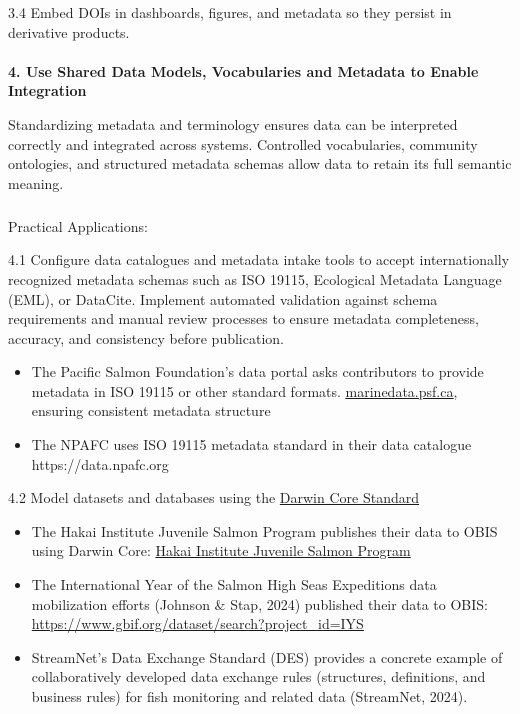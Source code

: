 \documentclass[
  letterpaper,
  DIV=11,
  numbers=noendperiod]{scrartcl}
\makeatletter
\let\oldparagraph\paragraph
\renewcommand{\paragraph}{
    \@ifstar
      \xxxParagraphStar
      \xxxParagraphNoStar
  }
\newcommand{\xxxParagraphStar}[1]{\oldparagraph*{#1}\mbox{}}
\newcommand{\xxxParagraphNoStar}[1]{\oldparagraph{#1}\mbox{}}
\let\oldsubparagraph\subparagraph
\renewcommand{\subparagraph}{
    \@ifstar
      \xxxSubParagraphStar
      \xxxSubParagraphNoStar
  }
\newcommand{\xxxSubParagraphStar}[1]{\oldsubparagraph*{#1}\mbox{}}
\newcommand{\xxxSubParagraphNoStar}[1]{\oldsubparagraph{#1}\mbox{}}
\providecommand{\tightlist}{%
  \setlength{\itemsep}{0pt}\setlength{\parskip}{0pt}}
\makeatother
\begin{document}
3.4 Embed DOIs in dashboards, figures, and metadata so they persist in
derivative products.

\paragraph{\texorpdfstring{\textbf{4. Use Shared Data Models,
Vocabularies and Metadata to Enable
Integration}}{4. Use Shared Data Models, Vocabularies and Metadata to Enable Integration}}\label{use-shared-data-models-vocabularies-and-metadata-to-enable-integration}

Standardizing metadata and terminology ensures data can be interpreted
correctly and integrated across systems. Controlled vocabularies,
community ontologies, and structured metadata schemas allow data to
retain its full semantic meaning.

\subparagraph{Practical Applications:}\label{practical-applications-3}

4.1 Configure data catalogues and metadata intake tools to accept
internationally recognized metadata schemas such as ISO 19115,
Ecological Metadata Language (EML), or DataCite. Implement automated
validation against schema requirements and manual review processes to
ensure metadata completeness, accuracy, and consistency before
publication.

\begin{itemize}
\tightlist
\item
  The Pacific Salmon Foundation's data portal asks contributors to
  provide metadata in ISO 19115 or other standard formats.
  \href{https://marinedata.psf.ca/data/data-submission-form/\#:~:text=}{\ul{marinedata.psf.ca}},
  ensuring consistent metadata structure
\item
  The NPAFC uses ISO 19115 metadata standard in their data catalogue
  https://data.npafc.org
\end{itemize}

4.2 Model datasets and databases using the
\href{https://dwc.tdwg.org/}{Darwin Core Standard}

\begin{itemize}
\item
  The Hakai Institute Juvenile Salmon Program publishes their data to
  OBIS using Darwin Core:
  \href{https://www.gbif.org/dataset/72de3af4-1572-4f2d-8006-2bfa2007065c}{Hakai
  Institute Juvenile Salmon Program}
\item
  The International Year of the Salmon High Seas Expeditions data
  mobilization efforts (Johnson \& Stap, 2024) published their data to
  OBIS: \url{https://www.gbif.org/dataset/search?project_id=IYS}
\item
  StreamNet's Data Exchange Standard (DES) provides a concrete example
  of collaboratively developed data exchange rules (structures,
  definitions, and business rules) for fish monitoring and related data
  (StreamNet, 2024).
\end{itemize}
\end{document}
